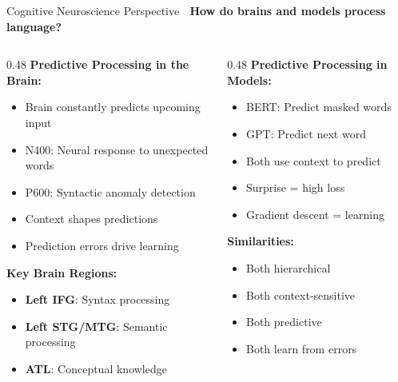\documentclass[aspectratio=169]{beamer}
\begin{document}
\begin{frame}[shrink=10]{Cognitive Neuroscience Perspective 🧠}
\textbf{How do brains and models process language?}

\vspace{1em}

\begin{columns}[T]
\begin{column}{0.48\textwidth}
\textbf{Predictive Processing in the Brain:}
\begin{itemize}\setlength{\itemsep}{0pt}
    \item Brain constantly predicts upcoming input
    \item N400: Neural response to unexpected words
    \item P600: Syntactic anomaly detection
    \item Context shapes predictions
    \item Prediction errors drive learning
\end{itemize}

\vspace{0.5em}

\textbf{Key Brain Regions:}
\begin{itemize}\setlength{\itemsep}{0pt}
    \item \textbf{Left IFG}: Syntax processing
    \item \textbf{Left STG/MTG}: Semantic processing
    \item \textbf{ATL}: Conceptual knowledge
\end{itemize}
\end{column}

\begin{column}{0.48\textwidth}
\textbf{Predictive Processing in Models:}
\begin{itemize}\setlength{\itemsep}{0pt}
    \item BERT: Predict masked words
    \item GPT: Predict next word
    \item Both use context to predict
    \item Surprise = high loss
    \item Gradient descent = learning
\end{itemize}

\vspace{0.5em}

\textbf{Similarities:}
\begin{itemize}\setlength{\itemsep}{0pt}
    \item Both hierarchical
    \item Both context-sensitive
    \item Both predictive
    \item Both learn from errors
\end{itemize}
\end{column}
\end{columns}


\end{frame}
\end{document}

